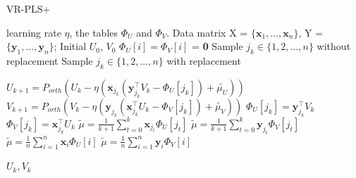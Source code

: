 \documentclass[conference]{IEEEtran}
\begin{document}
 \begin{algorithm}[t]
 	\caption{\textsc{VR-PLS+}}
	\label{VR-PLS+}
	\begin{algorithmic}[1]
	\Require learning rate $\eta$, the tables $\Phi_U$ and $\Phi_V$.
	\Input Data matrix X = $\{\mathbf{x}_1, ... , \mathbf{x}_n\}$, Y = $\{\mathbf{y}_1, ... , \mathbf{y}_n\}$; Initial $U_0$, $V_0$ 
	\State $\Phi_U[i] = \Phi_V[i]$ = \textbf{0}
	\EndFor
		\State Sample $j_{k} \in \{1, 2, ... ,n\}$ without replacement
		\Else
		\State Sample $j_{k} \in \{1, 2, ... ,n\}$ with replacement
		\EndIf
		
		\State $U_{k+1} = P_{orth}(U_{k} - \eta(\mathbf{x}_{j_k}(\mathbf{y}_{j_k}^{{\top}}V_k - \Phi_U[{j_k}]) + \tilde{\mu_U}))$ 
		\State $V_{k+1} = P_{orth}(V_{k} - \eta(\mathbf{y}_{j_k}( \mathbf{x}_{j_k}^{{\top}}U_k - \Phi_V[{j_k}]) + \tilde{\mu_V}))$
		\State $\Phi_U[{j_k}] = \mathbf{y}_{j_k}^{{\top}}V_k$
		\State $\Phi_V[{j_k}] = \mathbf{x}_{j_k}^{{\top}}U_k$
		\State $\tilde{\mu} = \frac{1}{k+1} \sum\limits_{t=0}^{k}\mathbf{x}_{j_t}\Phi_U[j_t]$
		\State $\tilde{\mu} = \frac{1}{k+1} \sum\limits_{t=0}^{k}\mathbf{y}_{j_t}\Phi_V[j_t]$
		\Else
		\State $\tilde{\mu} = \frac{1}{n} \sum\limits_{i=1}^{n}\mathbf{x}_{i}\Phi_U[i]$
		\State $\tilde{\mu} = \frac{1}{n} \sum\limits_{i=1}^{n}\mathbf{y}_{i}\Phi_V[i]$
		\EndIf
	\EndFor
	
	\State \Return $U_k, V_k$
	\end{algorithmic}
\end{algorithm}
 
 
\end{document}
